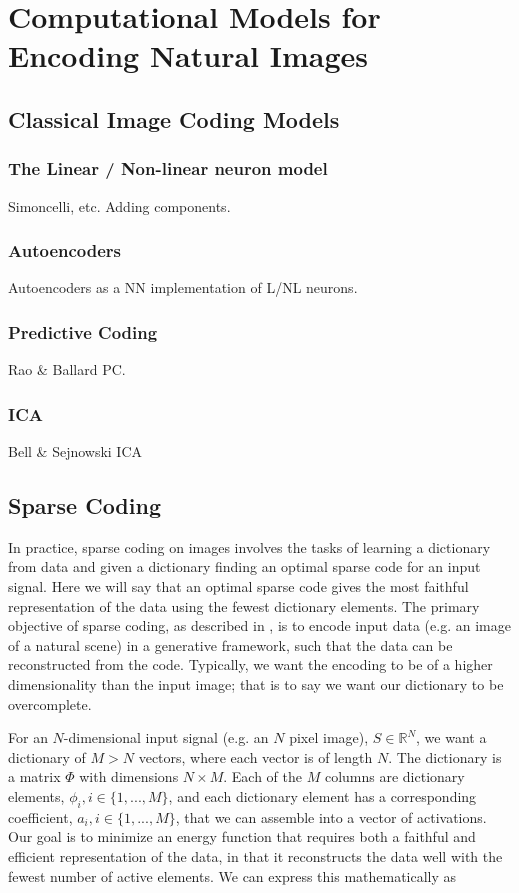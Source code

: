 \chapter{Computational Models for Encoding Natural Images}

\section{Classical Image Coding Models}

\subsection{The Linear / Non-linear neuron model}
Simoncelli, etc. Adding components.

\subsection{Autoencoders}
Autoencoders as a NN implementation of L/NL neurons.

\subsection{Predictive Coding}
Rao & Ballard PC.

\subsection{ICA}
Bell & Sejnowski ICA

\section{Sparse Coding}
In practice, sparse coding on images involves the tasks of learning a dictionary from data and given a dictionary finding an optimal sparse code for an input signal. Here we will say that an optimal sparse code gives the most faithful representation of the data using the fewest dictionary elements. The primary objective of sparse coding, as described in \cite{olshausen1997sparse}, is to encode input data (e.g. an image of a natural scene) in a generative framework, such that the data can be reconstructed from the code. Typically, we want the encoding to be of a higher dimensionality than the input image; that is to say we want our dictionary to be overcomplete.

For an $N$-dimensional input signal (e.g. an $N$ pixel image), $S \in \mathbb{R}^{N}$, we want a dictionary of $M > N$ vectors, where each vector is of length $N$. The dictionary is a matrix $\Phi$ with dimensions $N \times M$. Each of the $M$ columns are dictionary elements, $\phi_{i}, i \in \{1,...,M\}$, and each dictionary element has a corresponding coefficient, $a_{i}, i \in \{1,...,M\}$, that we can assemble into a vector of activations. Our goal is to minimize an energy function that requires both a faithful and efficient representation of the data, in that it reconstructs the data well with the fewest number of active elements. We can express this mathematically as

